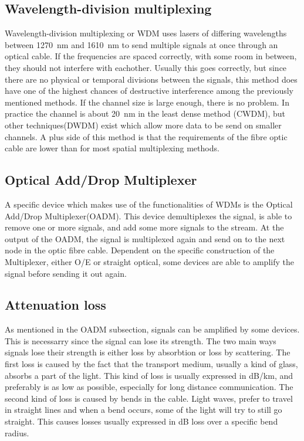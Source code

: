\subsection{Wavelength-division multiplexing}
Wavelength-division multiplexing or WDM uses lasers of differing wavelengths between \qty{1270}{\nm} and 
\qty{1610}{\nm} to send multiple signals at once through an optical cable. If the frequencies are spaced 
correctly, with some room in between, they should not interfere with eachother. Usually this goes correctly, 
but since there are no physical or temporal divisions between the signals, this method does have one of the 
highest chances of destructive interference among the previously mentioned methods. If the channel size is large 
enough, there is no problem. In practice the channel is about \qty{20}{\nm} in the least dense method (CWDM), 
but other techniques(DWDM) exist which allow more data to be send on smaller channels. A plus side of this method 
is that the requirements of the fibre optic cable are lower than for most spatial multiplexing methods.

\subsection{Optical Add/Drop Multiplexer}
A specific device which makes use of the functionalities of WDMs is the Optical Add/Drop Multiplexer(OADM). This 
device demultiplexes the signal, is able to remove one or more signals, and add some more signals to the stream. 
At the output of the OADM, the signal is multiplexed again and send on to the next node in the optic fibre cable.
Dependent on the specific construction of the Multiplexer, either O/E or straight optical, some devices are able 
to amplify the signal before sending it out again.

\subsection{Attenuation loss}
As mentioned in the OADM subsection, signals can be amplified by some devices. This is necessarry since the 
signal can lose its strength. The two main ways signals lose their strength is either loss by absorbtion 
or loss by scattering. The first loss is caused by the fact that the transport medium, usually a kind of glass, 
absorbs a part of the light. This kind of loss is usually expressed in dB/km, and preferably is as low as possible, 
especially for long distance communication. The second kind of loss is caused by bends in the cable. Light waves, 
prefer to travel in straight lines and when a bend occurs, some of the light will try to still go straight. This 
causes losses usually expressed in dB loss over a specific bend radius. 
